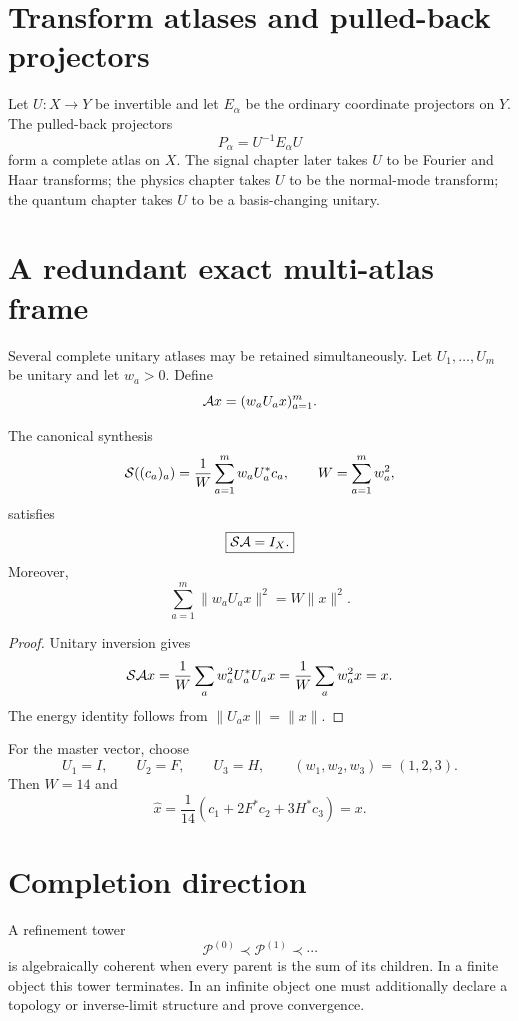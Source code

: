\section{Transform atlases and pulled-back projectors}
Let $U:X\to Y$ be invertible and let $E_\alpha$ be the ordinary coordinate projectors on $Y$.  The pulled-back projectors
\[
P_\alpha=U^{-1}E_\alpha U
\]
form a complete atlas on $X$.  The signal chapter later takes $U$ to be Fourier and Haar transforms; the physics chapter takes $U$ to be the normal-mode transform; the quantum chapter takes $U$ to be a basis-changing unitary.


\section{A redundant exact multi-atlas frame}
Several complete unitary atlases may be retained simultaneously.  Let $U_1,\ldots,U_m$ be unitary and let $w_a>0$.  Define
\[
\mathcal A x=(w_aU_ax)_{a=1}^m.
\]

\begin{theorem}\label{thm:multi-atlas}
The canonical synthesis
\[
\mathcal S((c_a)_a)
=
\frac{1}{W}
\sum_{a=1}^m w_aU_a^*c_a,
\qquad
W=\sum_{a=1}^m w_a^2,
\]
satisfies
\[
\boxed{\mathcal S\mathcal A=I_X.}
\]
Moreover,
\[
\sum_{a=1}^m\|w_aU_ax\|^2=W\|x\|^2.
\]
\end{theorem}

\begin{proof}
Unitary inversion gives
\[
\mathcal S\mathcal A x
=
\frac1W\sum_aw_a^2U_a^*U_ax
=
\frac1W\sum_aw_a^2x=x.
\]
The energy identity follows from $\|U_ax\|=\|x\|$.
\end{proof}

For the master vector, choose
\[
U_1=I,
\qquad
U_2=F,
\qquad
U_3=H,
\qquad
(w_1,w_2,w_3)=(1,2,3).
\]
Then $W=14$ and
\[
\widehat x
=
\frac1{14}
\left(c_1+2F^*c_2+3H^*c_3\right)
=x.
\]


\section{Completion direction}
A refinement tower
\[
\mathcal P^{(0)}\prec\mathcal P^{(1)}\prec\cdots
\]
is algebraically coherent when every parent is the sum of its children.  In a finite object this tower terminates.  In an infinite object one must additionally declare a topology or inverse-limit structure and prove convergence.

